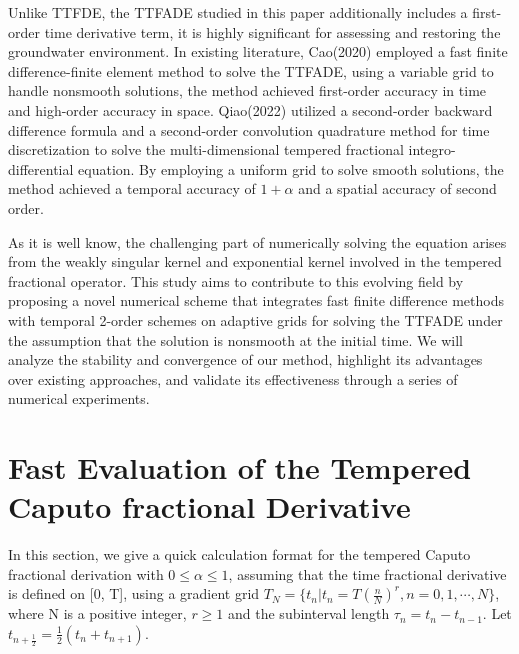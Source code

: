 \documentclass[10pt, reqno]{amsart}
\theoremstyle{remark}
\theoremstyle{definition}
\numberwithin{table}{section}
\begin{document}
Unlike TTFDE,  the TTFADE studied in this paper additionally includes a first-order time derivative term, it is highly significant for assessing and restoring the groundwater environment. In existing literature,  Cao(2020)\cite{cao2020} employed a fast finite difference-finite element method to solve the TTFADE, using a variable grid to handle nonsmooth solutions,  the method achieved first-order accuracy in time and high-order accuracy in space. Qiao(2022)\cite{qiao2022} utilized a second-order backward difference formula and a second-order convolution quadrature method for time discretization to solve the multi-dimensional tempered fractional integro-differential equation.  By employing a uniform grid to solve smooth solutions,  the method achieved a temporal accuracy of \(1 + \alpha\) and a spatial accuracy of second order. 

As it is well know, the challenging part of numerically solving the equation arises from the weakly singular kernel and exponential kernel involved in the tempered fractional operator. This study aims to contribute to this evolving field by proposing a novel numerical scheme that integrates fast finite difference methods with temporal 2-order schemes on adaptive grids for solving the TTFADE under the assumption that the solution is nonsmooth at the initial time. We will analyze the stability and convergence of our method,  highlight its advantages over existing approaches,  and validate its effectiveness through a series of numerical experiments.  

\section{Fast Evaluation of the Tempered Caputo fractional Derivative}
In this section,  we give a quick calculation format for the tempered Caputo fractional derivation with $0\leq \alpha \leq 1$,  assuming that the time fractional derivative is defined on [0,  T],  using a gradient grid $T_N=\{t_n|t_n=T(\frac{n}{N})^r, n = 0,  1,  \cdots ,  N \}$, where N is a positive integer,  $r \geq 1$ and the subinterval length $\tau_n = t_n-t_{n-1}$. Let $t_{n+\frac{1}{2}}=\frac{1}{2}(t_n+t_{n+1})$. 
\end{document}

